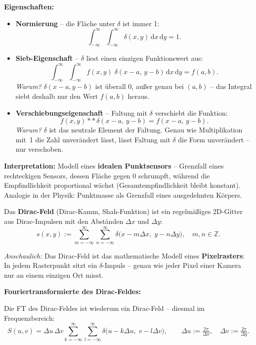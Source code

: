 \documentclass[12pt, a4paper]{article}
\begin{document}
\textbf{Eigenschaften:}
\begin{itemize}
  \item \textbf{Normierung} -- die Fläche unter $\delta$ ist immer 1:
        \[
          \int_{-\infty}^{\infty}\!\!\int_{-\infty}^{\infty}
          \delta(x,y)\,\mathrm{d}x\,\mathrm{d}y = 1.
        \]

  \item \textbf{Sieb-Eigenschaft} -- $\delta$ liest einen einzigen Funktionswert aus:
        \[
          \int_{-\infty}^{\infty}\!\!\int_{-\infty}^{\infty}
          f(x,y)\;\delta(x-a,\,y-b)\,\mathrm{d}x\,\mathrm{d}y = f(a,b).
        \]
        \textit{Warum?} $\delta(x-a,y-b)$ ist überall 0, außer genau bei $(a,b)$ -- das Integral \glqq{}siebt\grqq{} deshalb nur den Wert $f(a,b)$ heraus.

  \item \textbf{Verschiebungseigenschaft} -- Faltung mit $\delta$ verschiebt die Funktion:
        \[
          f(x,y) \ast\ast\,\delta(x-a,\,y-b) = f(x-a,\,y-b).
        \]
        \textit{Warum?} $\delta$ ist das neutrale Element der Faltung. Genau wie Multiplikation mit~1 die Zahl unverändert lässt, lässt Faltung mit $\delta$ die Form unverändert -- nur verschoben.
\end{itemize}

\textbf{Interpretation:} Modell eines \textbf{idealen Punktsensors} -- Grenzfall eines rechteckigen Sensors, dessen Fläche gegen 0 schrumpft, während die Empfindlichkeit proportional wächst (Gesamtempfindlichkeit bleibt konstant). Analogie in der Physik: Punktmasse als Grenzfall eines ausgedehnten Körpers.

\begin{definitionbox}
Das \textbf{Dirac-Feld} (Dirac-Kamm, Shah-Funktion) ist ein regelmäßiges 2D-Gitter aus Dirac-Impulsen mit den Abständen $\Delta x$ und $\Delta y$:
\[
  s(x,y) := \sum_{m=-\infty}^{\infty}\sum_{n=-\infty}^{\infty}
  \delta\bigl(x - m\Delta x,\; y - n\Delta y\bigr), \quad m,n\in\mathbb{Z}.
\]
\end{definitionbox}

\textit{Anschaulich:} Das Dirac-Feld ist das mathematische Modell eines \textbf{Pixelrasters}: In jedem Rasterpunkt sitzt ein $\delta$-Impuls -- genau wie jeder Pixel einer Kamera nur an einem einzigen Ort misst.

\textbf{Fouriertransformierte des Dirac-Feldes:}

Die FT des Dirac-Feldes ist wiederum ein Dirac-Feld -- diesmal im Frequenzbereich:
\[
  S(u,v) = \Delta u\,\Delta v
  \sum_{k=-\infty}^{\infty}\sum_{l=-\infty}^{\infty}
  \delta\bigl(u - k\Delta u,\; v - l\Delta v\bigr),
  \qquad
  \Delta u := \tfrac{2\pi}{\Delta x},\quad
  \Delta v := \tfrac{2\pi}{\Delta y}.
\]
\end{document}
